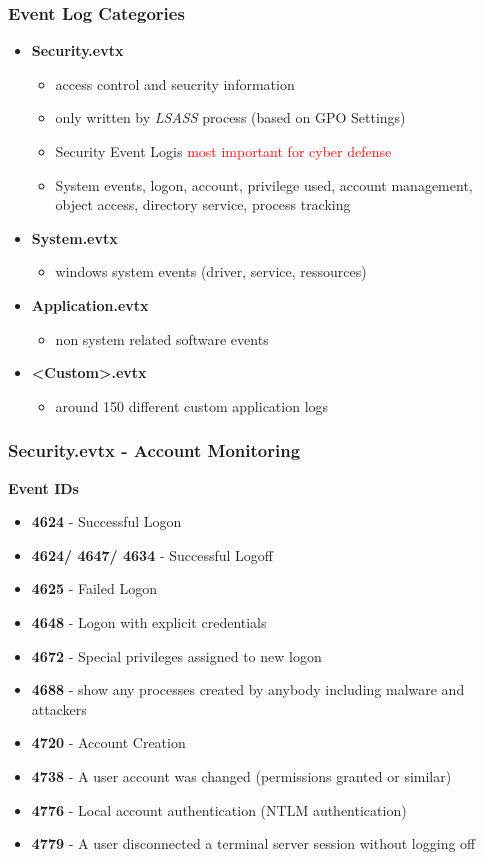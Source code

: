 \subsubsection{Event Log Categories}
\begin{itemize}
    \item \textbf{Security.evtx}
    \begin{itemize}
        \item access control and seucrity information
        \item only written by \textit{LSASS} process (based on GPO Settings)
        \item \glqq Security Event Log\grqq is \textcolor{red}{most important for cyber defense}
        \item System events, logon, account, privilege used, account management, object access, directory service, process tracking
    \end{itemize}
    \item \textbf{System.evtx}
    \begin{itemize}
        \item windows system events (driver, service, ressources)
    \end{itemize}
    \item \textbf{Application.evtx}
    \begin{itemize}
        \item non system related software events
    \end{itemize}
    \item \textbf{<Custom>.evtx}
    \begin{itemize}
        \item around 150 different custom application logs
    \end{itemize}
\end{itemize}

\subsubsection{Security.evtx - Account Monitoring}
\textbf{Event IDs}
\begin{itemize}
    \item \textbf{4624} - Successful Logon
    \item \textbf{4624/ 4647/ 4634} - Successful Logoff
    \item \textbf{4625} - Failed Logon
    \item \textbf{4648} - Logon with explicit credentials
    \item \textbf{4672} - Special privileges assigned to new logon
    \item \textbf{4688} - show any processes created by anybody including malware and attackers
    \item \textbf{4720} - Account Creation
    \item \textbf{4738} - A user account was changed (permissions granted or similar)
    \item \textbf{4776} - Local account authentication (NTLM authentication)
    \item \textbf{4779} - A user disconnected a terminal server session without logging off
\end{itemize}

